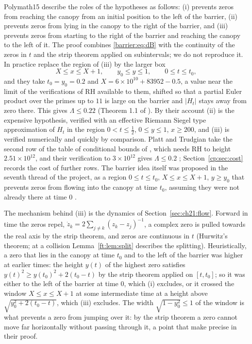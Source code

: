 Polymath15 describe the roles of the hypotheses as follows: (i) prevents zeros from reaching the canopy from an initial position to the left of the barrier, (ii) prevents zeros from lying in the canopy to the right of the barrier, and (iii) prevents zeros from starting to the right of the barrier and reaching the canopy to the left of it. The proof combines \eqref{barrier:eq:dB} with the continuity of the zeros in $t$ and the strip theorem applied on subintervals; we do not reproduce it. In practice \cite{Polymath} replace the region of (iii) by the larger box
\begin{equation}\label{barrier:eq:box}
X\le x\le X+1,\qquad y_0\le y\le1,\qquad 0\le t\le t_0,
\end{equation}
and they take $t_0=y_0=0.2$ and $X=6\times10^{10}+83952-0.5$, a value near the limit of the verifications of RH available to them, shifted so that a partial Euler product over the primes up to $11$ is large on the barrier and $|H_t|$ stays away from zero there. This gives $\Lambda\le0.22$ (Theorem 1.1 of \cite{Polymath}). By their account (ii) is the expensive hypothesis, verified with an effective Riemann Siegel type approximation of $H_t$ in the region $0<t\le\frac12$, $0\le y\le1$, $x\ge200$, and (iii) is verified numerically and quickly by comparison. Platt and Trudgian take the second row of the table of conditional bounds of \cite{Polymath}, which needs RH to height $2.51\times10^{12}$, and their verification to $3\times10^{12}$ gives $\Lambda\le0.2$ \cite{PT21}; Section~\ref{cp:sec:cost} records the cost of further rows. The barrier idea itself was proposed in the seventh thread of the project, as a region $0\le t\le t_0$, $X\le x\le X+1$, $y\ge y_0$ that prevents zeros from flowing into the canopy at time $t_0$, assuming they were not already there at time $0$ \cite{NCPolymath7}.

\begin{remark}\label{barrier:rem:dynamics}
The mechanism behind (iii) is the dynamics of Section~\ref{sec:ch21:flow}. Forward in time the zeros repel, $\dot z_k=2\sum_{j\ne k}(z_k-z_j)^{-1}$, a complex zero is pulled towards the real axis by the strip theorem, and zeros are continuous in $t$ (Hurwitz's theorem; at a collision Lemma~\ref{ft:lem:split} describes the splitting). Heuristically, a zero that lies in the canopy at time $t_0$ and to the left of the barrier was higher at earlier times: the height $y(t)$ of the highest zero satisfies $y(t)^2\ge y(t_0)^2+2(t_0-t)$ by the strip theorem applied on $[t,t_0]$; so it was either to the left of the barrier at time $0$, which (i) excludes, or it crossed the window $X\le x\le X+1$ at some intermediate time at a height above $\sqrt{y_0^2+2(t_0-t)}$, which (iii) excludes. The width $\sqrt{1-y_0^2}\le1$ of the window is what prevents a zero from jumping over it: by the strip theorem a zero cannot move far horizontally without passing through it, a point that \cite{Polymath} make precise in their proof.
\end{remark}

